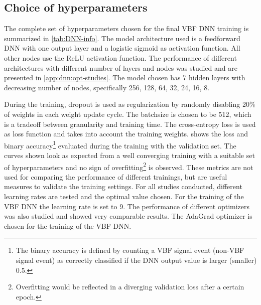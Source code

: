 \subsection{Choice of hyperparameters}
\label{subsec:hyper-parameters}
The complete set of hyperparameters chosen for the final VBF DNN training is summarized in \cref{tab:DNN-info}. The model architecture used is a feedforward DNN with one output layer and a logistic sigmoid as activation function. All other nodes use the ReLU activation function.
The performance of different architectures with different number of layers and nodes was studied and are presented in \cref{app:dnn:opt-studies}.
The model chosen has 7 hidden layers with decreasing number of nodes, specifically {256, 128, 64, 32, 24, 16, 8}.

During the training, dropout is used as regularization by randomly disabling 20\% of weights in each weight update cycle.
The batchsize is chosen to be 512, which is a tradeoff between granularity and training time.
The cross-entropy loss is used as loss function and takes into account the training weights.
 shows the loss and binary accuracy\footnote{The binary accuracy is defined by counting a VBF signal event (non-VBF signal event) as correctly classified if the DNN output value is larger (smaller) 0.5.
} evaluated during the training with the validation set.
The curves shown look as expected from a well converging training with a suitable set of hyperparameters and no sign of overfitting\footnote{Overfitting would be reflected in a diverging validation loss after a certain epoch.} is observed. These metrics are not used for comparing the performance of different trainings, but are useful measures to validate the training settings. For all studies conducted, different learning rates are tested and the optimal value chosen.
For the training of the VBF DNN the learning rate is set to 9.
The performance of different optimizers was also studied and showed very comparable results. The AdaGrad optimizer is chosen for the training of the VBF DNN.


